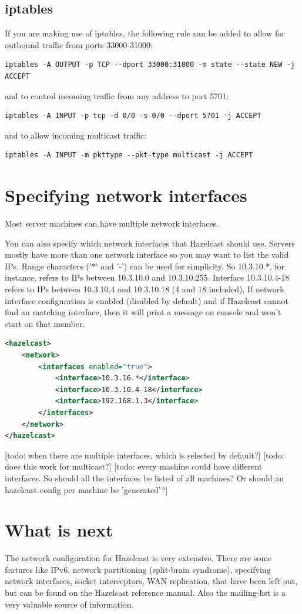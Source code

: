\subsection{iptables}
If you are making use of iptables, the following rule can be added to allow for outbound traffic from ports 33000-31000:
\begin{lstlisting}
iptables -A OUTPUT -p TCP --dport 33000:31000 -m state --state NEW -j ACCEPT
\end{lstlisting}
and to control incoming traffic from any address to port 5701:
\begin{lstlisting}
iptables -A INPUT -p tcp -d 0/0 -s 0/0 --dport 5701 -j ACCEPT
\end{lstlisting}
and to allow incoming multicast traffic:
\begin{lstlisting}
iptables -A INPUT -m pkttype --pkt-type multicast -j ACCEPT
\end{lstlisting}

\section{Specifying network interfaces}
Most server machines can have multiple network interfaces. 

You can also specify which network interfaces that Hazelcast should use. Servers mostly have more than one network interface so you may want to list the valid IPs. Range characters ('*' and '-') can be used for simplicity. So 10.3.10.*, for instance, refers to IPs between 10.3.10.0 and 10.3.10.255. Interface 10.3.10.4-18 refers to IPs between 10.3.10.4 and 10.3.10.18 (4 and 18 included). If network interface configuration is enabled (disabled by default) and if Hazelcast cannot find an matching interface, then it will print a message on console and won't start on that member.

\begin{lstlisting}[language=xml]
<hazelcast>
    <network>
        <interfaces enabled="true">
            <interface>10.3.16.*</interface> 
            <interface>10.3.10.4-18</interface> 
            <interface>192.168.1.3</interface>         
        </interfaces>    
    </network>
</hazelcast>
\end{lstlisting}

[todo: when there are multiple interfaces, which is selected by default?]
[todo: does this work for multicast?]
[todo: every machine could have different interfaces. So should all the interfaces be listed of all machines? Or should an hazelcast config per machine be 'generated'?]

\section{What is next}
The network configuration for Hazelcast is very extensive. There are some features like IPv6,  network partitioning (split-brain syndrome), specifying network interfaces, socket interceptors, WAN replication, that have been left out, but can be found on the Hazelcast reference manual. Also the mailing-list is a very valuable source of information.

